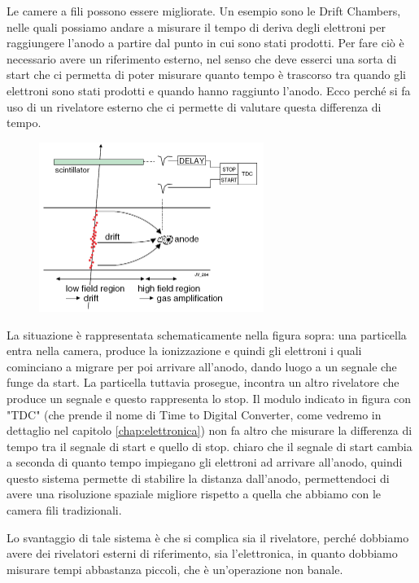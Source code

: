 Le camere a fili possono essere migliorate. Un esempio sono le Drift Chambers, nelle quali possiamo andare a misurare il tempo di deriva degli elettroni per raggiungere l'anodo a partire dal punto in cui sono stati prodotti. Per fare ciò è necessario avere un riferimento esterno, nel senso che deve esserci una sorta di start che ci permetta di poter misurare quanto tempo è trascorso tra quando gli elettroni sono stati prodotti e quando hanno raggiunto l'anodo. Ecco perché si fa uso di un rivelatore esterno che ci permette di valutare questa differenza di tempo.
\begin{figure}[H]
   \centering
   \includegraphics[width=0.65\textwidth]{immagini/drift_chambers.png}
\end{figure}
La situazione è rappresentata schematicamente nella figura sopra: una particella entra nella camera, produce la ionizzazione e quindi gli elettroni i quali cominciano a migrare per poi arrivare all'anodo, dando luogo a un segnale che funge da start. La particella tuttavia prosegue, incontra un altro rivelatore che produce un segnale e questo rappresenta lo stop. Il modulo indicato in figura con "TDC" (che prende il nome di Time to Digital Converter, come vedremo in dettaglio nel capitolo \ref{chap:elettronica}) non fa altro che misurare la differenza di tempo tra il segnale di start e quello di stop. \E chiaro che il segnale di start cambia a seconda di quanto tempo impiegano gli elettroni ad arrivare all'anodo, quindi questo sistema permette di stabilire la distanza dall'anodo, permettendoci di avere una risoluzione spaziale migliore rispetto a quella che abbiamo con le camera fili tradizionali.

Lo svantaggio di tale sistema è che si complica sia il rivelatore, perché dobbiamo avere dei rivelatori esterni di riferimento, sia l'elettronica, in quanto dobbiamo misurare tempi abbastanza piccoli, che è un'operazione non banale.

